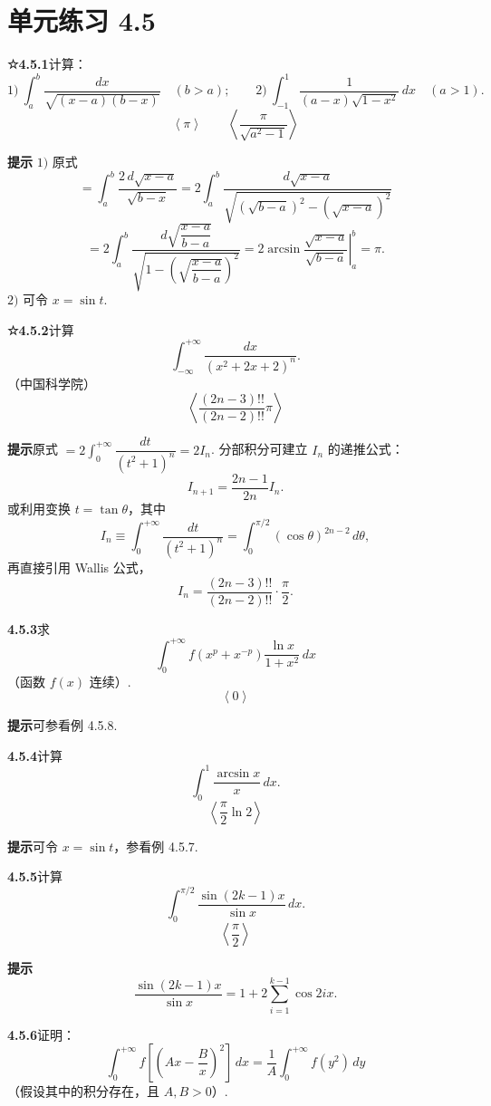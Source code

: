 \documentclass[UTF8,12pt,a4paper,fontset=fandol]{ctexart}
\begin{document}
\section*{单元练习 4.5}

\noindent\textbf{☆4.5.1}\quad 计算：
\[
1)\ \int_a^b\frac{dx}{\sqrt{(x-a)(b-x)}}\quad(b>a);\qquad
2)\ \int_{-1}^1\frac1{(a-x)\sqrt{1-x^2}}\,dx\quad(a>1).
\]
\[
\left\langle \pi \right\rangle\qquad
\left\langle \frac{\pi}{\sqrt{a^2-1}} \right\rangle
\]

\noindent\textbf{提示}\quad
$1)$ 原式
\[
=\int_a^b\frac{2\,d\sqrt{x-a}}{\sqrt{b-x}}
=2\int_a^b\frac{d\sqrt{x-a}}{\sqrt{(\sqrt{b-a})^2-(\sqrt{x-a})^2}}
\]
\[
=2\int_a^b\frac{d\sqrt{\dfrac{x-a}{b-a}}}
{\sqrt{1-\left(\sqrt{\dfrac{x-a}{b-a}}\right)^2}}
=2\arcsin\left.\frac{\sqrt{x-a}}{\sqrt{b-a}}\right|_a^b=\pi.
\]
$2)$ 可令 $x=\sin t$.

\noindent\textbf{☆4.5.2}\quad 计算
\[
\int_{-\infty}^{+\infty}\frac{dx}{(x^2+2x+2)^n}.
\]
（中国科学院）
\[
\left\langle \frac{(2n-3)!!}{(2n-2)!!}\pi \right\rangle
\]

\noindent\textbf{提示}\quad 原式 $=2\displaystyle\int_0^{+\infty}\dfrac{dt}{(t^2+1)^n}=2I_n$. 分部积分可建立 $I_n$ 的递推公式：
\[
I_{n+1}=\frac{2n-1}{2n}I_n.
\]
或利用变换 $t=\tan\theta$，其中
\[
I_n\equiv\int_0^{+\infty}\frac{dt}{(t^2+1)^n}
=\int_0^{\pi/2}(\cos\theta)^{2n-2}\,d\theta,
\]
再直接引用 Wallis 公式，
\[
I_n=\frac{(2n-3)!!}{(2n-2)!!}\cdot\frac\pi2.
\]

\noindent\textbf{4.5.3}\quad 求
\[
\int_0^{+\infty}f(x^p+x^{-p})\frac{\ln x}{1+x^2}\,dx
\]
（函数 $f(x)$ 连续）.
\[
\left\langle 0 \right\rangle
\]

\noindent\textbf{提示}\quad 可参看例 4.5.8.

\noindent\textbf{4.5.4}\quad 计算
\[
\int_0^1\frac{\arcsin x}{x}\,dx.
\]
\[
\left\langle\frac\pi2\ln2\right\rangle
\]

\noindent\textbf{提示}\quad 可令 $x=\sin t$，参看例 4.5.7.

\noindent\textbf{4.5.5}\quad 计算
\[
\int_0^{\pi/2}\frac{\sin(2k-1)x}{\sin x}\,dx.
\]
\[
\left\langle\frac\pi2\right\rangle
\]

\noindent\textbf{提示}\quad
\[
\frac{\sin(2k-1)x}{\sin x}=1+2\sum_{i=1}^{k-1}\cos2ix.
\]

\noindent\textbf{4.5.6}\quad 证明：
\[
\int_0^{+\infty}f\left[\left(Ax-\frac Bx\right)^2\right]\,dx
=\frac1A\int_0^{+\infty}f(y^2)\,dy
\]
（假设其中的积分存在，且 $A,B>0$）.
\end{document}
